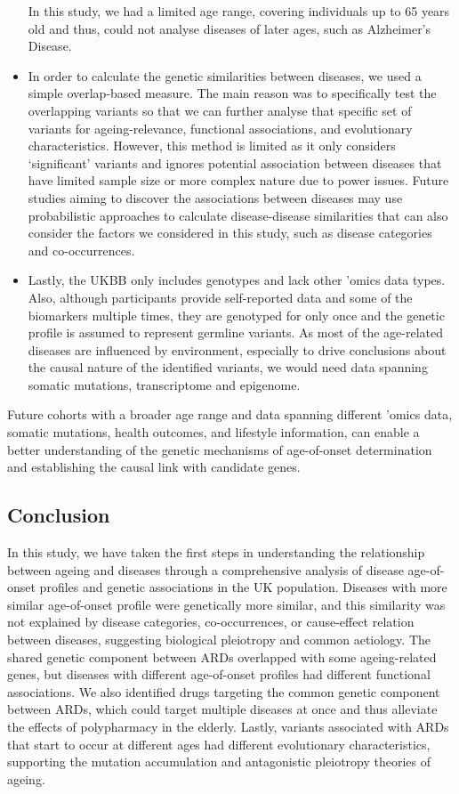 \documentclass[12pt,twoside]{unicam}
\begin{document}
\begin{itemize}
  In this study, we had a limited age range, covering individuals up to 65 years old and thus, could not analyse diseases of later ages, such as Alzheimer's Disease.
\item
  In order to calculate the genetic similarities between diseases, we used a simple overlap-based measure. The main reason was to specifically test the overlapping variants so that we can further analyse that specific set of variants for ageing-relevance, functional associations, and evolutionary characteristics. However, this method is limited as it only considers `significant' variants and ignores potential association between diseases that have limited sample size or more complex nature due to power issues. Future studies aiming to discover the associations between diseases may use probabilistic approaches to calculate disease-disease similarities that can also consider the factors we considered in this study, such as disease categories and co-occurrences.
\item
  Lastly, the UKBB only includes genotypes and lack other 'omics data types. Also, although participants provide self-reported data and some of the biomarkers multiple times, they are genotyped for only once and the genetic profile is assumed to represent germline variants. As most of the age-related diseases are influenced by environment, especially to drive conclusions about the causal nature of the identified variants, we would need data spanning somatic mutations, transcriptome and epigenome.
\end{itemize}

Future cohorts with a broader age range and data spanning different 'omics data, somatic mutations, health outcomes, and lifestyle information, can enable a better understanding of the genetic mechanisms of age-of-onset determination and establishing the causal link with candidate genes.

\hypertarget{conclusion-1}{%
\subsection{Conclusion}\label{conclusion-1}}

In this study, we have taken the first steps in understanding the relationship between ageing and diseases through a comprehensive analysis of disease age-of-onset profiles and genetic associations in the UK population. Diseases with more similar age-of-onset profile were genetically more similar, and this similarity was not explained by disease categories, co-occurrences, or cause-effect relation between diseases, suggesting biological pleiotropy and common aetiology. The shared genetic component between ARDs overlapped with some ageing-related genes, but diseases with different age-of-onset profiles had different functional associations. We also identified drugs targeting the common genetic component between ARDs, which could target multiple diseases at once and thus alleviate the effects of polypharmacy in the elderly. Lastly, variants associated with ARDs that start to occur at different ages had different evolutionary characteristics, supporting the mutation accumulation and antagonistic pleiotropy theories of ageing.
\end{document}
